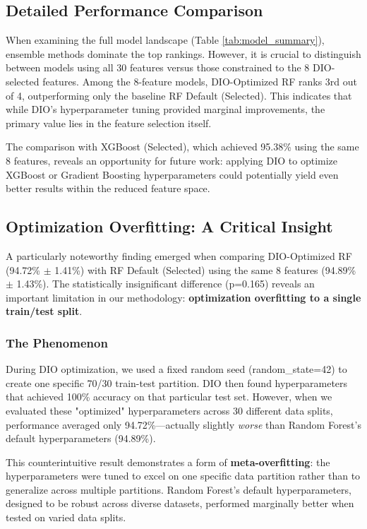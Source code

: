 \documentclass[12pt, a4paper]{article}
\begin{document}
\subsection{Detailed Performance Comparison}
When examining the full model landscape (Table \ref{tab:model_summary}), ensemble methods dominate the top rankings. However, it is crucial to distinguish between models using all 30 features versus those constrained to the 8 DIO-selected features. Among the 8-feature models, DIO-Optimized RF ranks 3rd out of 4, outperforming only the baseline RF Default (Selected). This indicates that while DIO's hyperparameter tuning provided marginal improvements, the primary value lies in the feature selection itself.

The comparison with XGBoost (Selected), which achieved 95.38\% using the same 8 features, reveals an opportunity for future work: applying DIO to optimize XGBoost or Gradient Boosting hyperparameters could potentially yield even better results within the reduced feature space.

\subsection{Optimization Overfitting: A Critical Insight}
A particularly noteworthy finding emerged when comparing DIO-Optimized RF (94.72\% $\pm$ 1.41\%) with RF Default (Selected) using the same 8 features (94.89\% $\pm$ 1.43\%). The statistically insignificant difference (p=0.165) reveals an important limitation in our methodology: \textbf{optimization overfitting to a single train/test split}.

\subsubsection{The Phenomenon}
During DIO optimization, we used a fixed random seed (random\_state=42) to create one specific 70/30 train-test partition. DIO then found hyperparameters that achieved 100\% accuracy on that particular test set. However, when we evaluated these "optimized" hyperparameters across 30 different data splits, performance averaged only 94.72\%—actually slightly \textit{worse} than Random Forest's default hyperparameters (94.89\%).

This counterintuitive result demonstrates a form of \textbf{meta-overfitting}: the hyperparameters were tuned to excel on one specific data partition rather than to generalize across multiple partitions. Random Forest's default hyperparameters, designed to be robust across diverse datasets, performed marginally better when tested on varied data splits.
\end{document}

